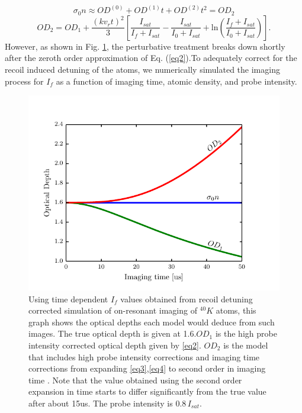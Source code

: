 \documentclass[12pt]{iopart}
\begin{document}
\begin{equation}
\sigma_0n\approx OD^{(0)}+OD^{(1)}t+OD^{(2)}t^2 = OD_2
\end{equation}
\begin{equation}
OD_2= OD_1+\frac{(kv_rt)^2}{3}\left[\frac{I_{sat}}{I_f+I_{sat}}-\frac{I_{sat}}{I_0+I_{sat}}+\mathrm{ln}\left(\frac{I_f+I_{sat}}{I_0+I_{sat}}\right)\right].
\end{equation}
 However, as shown in  Fig. \ref{fig:ODcorrections}, the perturbative treatment breaks down shortly after the zeroth order approximation of Eq. (\ref{eq2}).To adequately correct for the recoil induced detuning of the atoms, we numerically simulated the imaging process for $I_f$ as a function of imaging time, atomic density, and probe intensity. 
\begin{figure}
	\includegraphics*{figure2.pdf}
\caption{Using time dependent $I_f$ values obtained from recoil detuning corrected simulation of on-resonant imaging of $^{40}K$ atoms, this graph shows the optical depths each model would deduce from such images. The true optical depth is given at 1.6.$OD_1$ is the high probe intensity corrected optical depth given by \ref{eq2}. $OD_2$ is the model that includes high probe intensity corrections and imaging time corrections from expanding \ref{eq3},\ref{eq4} to second order in imaging time \cite{LJLthesis}. Note that the value obtained using the second order expansion in time starts to differ significantly from the true value after about 15us. The probe intensity is $0.8\, I_{sat}$. }  
\label{fig:ODcorrections}
\end{figure}
\end{document}
